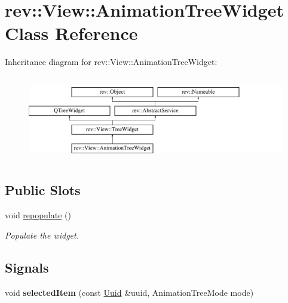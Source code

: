 \hypertarget{classrev_1_1_view_1_1_animation_tree_widget}{}\section{rev\+::View\+::Animation\+Tree\+Widget Class Reference}
\label{classrev_1_1_view_1_1_animation_tree_widget}
Inheritance diagram for rev\+::View\+::Animation\+Tree\+Widget\+:\begin{figure}[H]
\begin{center}
\leavevmode
\includegraphics[height=3.771044cm]{classrev_1_1_view_1_1_animation_tree_widget}
\end{center}
\end{figure}
\subsection*{Public Slots}
\begin{DoxyCompactItemize}
\item 
\mbox{\label{classrev_1_1_view_1_1_animation_tree_widget_ab97dbe8f0b2b3069d84a00cea1ecb5a2}} 
void \mbox{\hyperlink{classrev_1_1_view_1_1_animation_tree_widget_ab97dbe8f0b2b3069d84a00cea1ecb5a2}{repopulate}} ()
\begin{DoxyCompactList}\small\item\em Populate the widget. \end{DoxyCompactList}\end{DoxyCompactItemize}
\subsection*{Signals}
\begin{DoxyCompactItemize}
\item 
\mbox{\label{classrev_1_1_view_1_1_animation_tree_widget_a21af728967fb4fadc9d14e79413765e3}} 
void {\bfseries selected\+Item} (const \mbox{\hyperlink{classrev_1_1_uuid}{Uuid}} \&uuid, Animation\+Tree\+Mode mode)
\end{DoxyCompactItemize}

